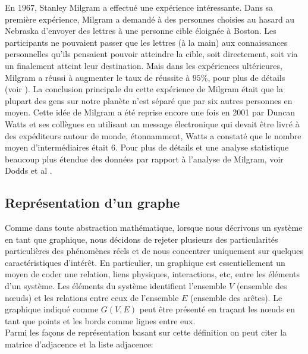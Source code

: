 En $1967$, Stanley Milgram a effectué une expérience intéressante.  Dans sa première expérience, Milgram a demandé à des personnes choisies au hasard au Nebraska d'envoyer des lettres à une personne cible éloignée à Boston.
Les participants ne pouvaient passer que les lettres (à la main) aux connaissances personnelles qu'ils pensaient pouvoir 
atteindre la cible, soit directement, soit via un %
finalement atteint leur destination. Mais dans les expériences ultérieures, Milgram a réussi à augmenter
le taux de réussite à $95\%$, pour plus de détails (voir \cite{Mi1967,TM1969}). La conclusion principale du cette expérience
de Milgram était que la plupart des gens sur notre planète n'est séparé que par six autres personnes en moyen. Cette idée de
Milgram a été reprise encore une fois en 2001 par Duncan Watts et ses collègues en utilisant un message électronique qui devait être livré à des expéditeurs autour de monde, étonnamment, Watts a constaté que le nombre moyen d'intermédiaires était
$6$. Pour plus de détails et une analyse statistique beaucoup plus étendue des données par rapport à l'analyse de Milgram,
voir Dodds et al \cite{D-al2003}.

  \subsection{Représentation d'un graphe}
  Comme dans toute abstraction mathématique, lorsque nous décrivons un système en tant que graphique, nous décidons de rejeter  plusieurs des particularités particulières des phénomènes réels et de nous concentrer uniquement sur quelques caractéristiques  d'intérêt. En particulier, un graphique est essentiellement un moyen de coder une relation, liens physiques, interactions,
  etc, entre les éléments d'un système. Les éléments du système identifient l'ensemble $V$ (ensemble des nœuds) et les relations entre ceux de l'ensemble $E$ (ensemble des arêtes). Le graphique indiqué comme $G(V, E)$ peut être présenté en traçant les  nœuds en tant que points et les bords comme lignes entre eux.\\ 
 
   Parmi les façons de représentation basant sur cette définition on peut citer la matrice d'adjacence et la liste adjacence:
